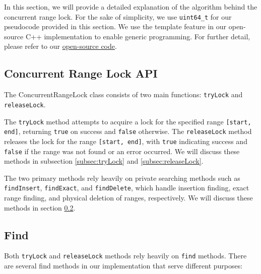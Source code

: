 In this section, we will provide a detailed explanation of the algorithm behind the concurrent range lock. For the sake of simplicity, we use \texttt{uint64\_t} for our pseudocode provided in this section. 
We use the template feature in our open-source C++ implementation to enable generic programming. 
For further detail, please refer to our \href{https://github.com/thuaduc/concurrent-range-locking}{open-source code}.

\newpage

\subsection{Concurrent Range Lock API}\label{subsec:api}

The ConcurrentRangeLock class consists of two main functions: \texttt{tryLock} and \texttt{releaseLock}.

The \texttt{tryLock} method attempts to acquire a lock for the specified range \texttt{[start, end]}, returning \texttt{true} on success and \texttt{false} otherwise.
The \texttt{releaseLock} method releases the lock for the range \texttt{[start, end]}, with \texttt{true} indicating success and \texttt{false} if the range was not found or an error occurred.
We will discuss these methods in subsection \ref{subsec:tryLock} and \ref{subsec:releaseLock}.

The two primary methods rely heavily on private searching methods such as \texttt{findInsert}, \texttt{findExact}, and \texttt{findDelete}, which handle insertion finding, exact range finding, and physical deletion of ranges, respectively. We will discuss these methods in section \ref{subsec:find}.

\begin{figure}[h]
    \centering
    
\end{figure}

\subsection{Find}\label{subsec:find}

Both \texttt{tryLock} and \texttt{releaseLock} methods rely heavily on \texttt{find} methods.
There are several find methods in our implementation that serve different purposes:


